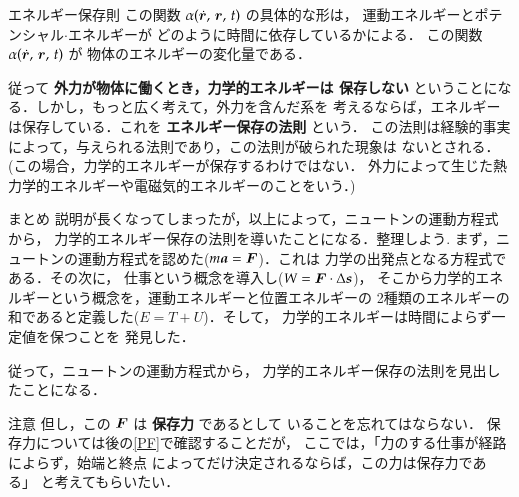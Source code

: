 \begin{mysmallsec}{エネルギー保存則}
                この関数 $\alpha (\dot{\boldsymbol{r}},\,\boldsymbol{r},\,t)$ の具体的な形は，
                運動エネルギーとポテンシャル$\cdot$エネルギーが
                どのように時間に依存しているかによる．
                この関数 $\alpha(\dot{\boldsymbol{r}},\,\boldsymbol{r},\,t)$ が
                物体のエネルギーの変化量である．

                従って \textbf{外力が物体に働くとき，力学的エネルギーは
                保存しない} ということになる．しかし，もっと広く考えて，外力を含んだ系を
                考えるならば，エネルギーは保存している．これを \textbf{エネルギー保存の法則} という．
                この法則は経験的事実によって，与えられる法則であり，この法則が破られた現象は
                ないとされる．
                (この場合，力学的エネルギーが保存するわけではない．
                外力によって生じた熱力学的エネルギーや電磁気的エネルギーのことをいう．)
            \end{mysmallsec}

            \begin{mysmallsec}{まとめ}
                説明が長くなってしまったが，以上によって，ニュートンの運動方程式から，
                力学的エネルギー保存の法則を導いたことになる．整理しよう.
                まず，ニュートンの運動方程式を認めた($m\textit{\textbf{a}}=\boldsymbol{F}$)．これは
                力学の出発点となる方程式である．その次に，
                仕事という概念を導入し($W=\boldsymbol{F}\cdot \Delta \textit{\textbf{s}}$)，
                そこから力学的エネルギーという概念を，運動エネルギーと位置エネルギーの
                2種類のエネルギーの和であると定義した($E=T+U$)．そして，
                力学的エネルギーは時間によらず一定値を保つことを
                発見した．

                従って，ニュートンの運動方程式から，
                力学的エネルギー保存の法則を見出したことになる．
            \end{mysmallsec}

            \begin{memo}{注意}
                但し，この $\boldsymbol{F}$ は \textbf{保存力} であるとして
                いることを忘れてはならない．
                保存力については後の\ref{PF}で確認することだが，
                ここでは，「力のする仕事が経路によらず，始端と終点
                によってだけ決定されるならば，この力は保存力である」
                と考えてもらいたい．
            \end{memo}



